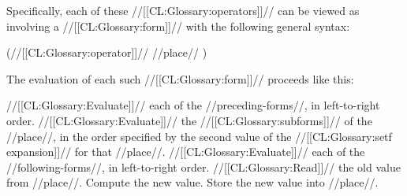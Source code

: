 Specifically, each of these //[[CL:Glossary:operators]]// can be viewed as involving a //[[CL:Glossary:form]]// with the following general syntax:

\code
 (//[[CL:Glossary:operator]]//  //place// ) \endcode

The evaluation of each such //[[CL:Glossary:form]]// proceeds like this:

\beginlist {} //[[CL:Glossary:Evaluate]]// each of the //preceding-forms//, in left-to-right order.  //[[CL:Glossary:Evaluate]]// the //[[CL:Glossary:subforms]]// of the //place//,
 in the order specified by the second value of the //[[CL:Glossary:setf expansion]]//
 for that //place//.  //[[CL:Glossary:Evaluate]]// each of the //following-forms//, in left-to-right order.  //[[CL:Glossary:Read]]// the old value from //place//.  Compute the new value.  Store the new value into //place//. \endlist


\endsubSection%
